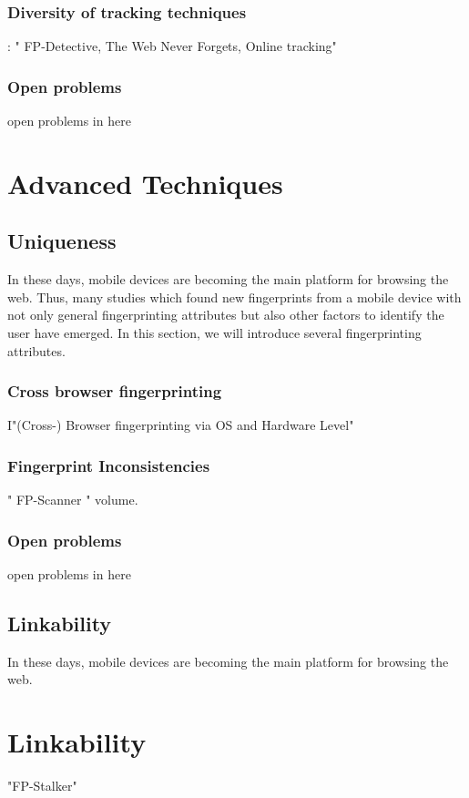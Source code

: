 \documentclass[sigconf]{acmart}   	%
\begin{document}
\subsubsection*{\bf Diversity of tracking techniques}
 : " FP-Detective, The Web Never Forgets, Online tracking"
\subsubsection*{\bf Open problems}  
open problems in here

\section{Advanced Techniques}

\subsection{Uniqueness}
In these days, mobile devices are becoming the main platform for browsing the web. Thus, many studies\cite{lim2016characterizing, miskovic2015appprint, bermejo2017steal, van2016accelerometer} which found new fingerprints from a mobile device with not only general fingerprinting attributes but also other factors to identify the user have emerged. In this section, we will introduce several fingerprinting attributes.
\subsubsection*{\bf Cross browser fingerprinting}
I"(Cross-) Browser fingerprinting via OS and Hardware Level"
\subsubsection*{\bf Fingerprint Inconsistencies}   
" FP-Scanner "
volume\cite{miskovic2015appprint}.
\subsubsection*{\bf Open problems}  
open problems in here

\subsection{Linkability}
In these days, mobile devices are becoming the main platform for browsing the web. 
\section{Linkability}
"FP-Stalker"
\end{document}
